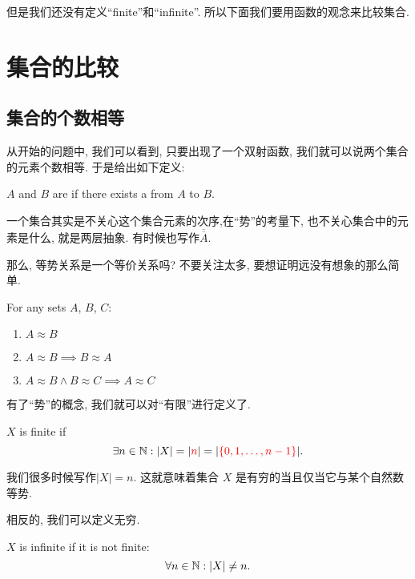 但是我们还没有定义``finite''和``infinite''. 所以下面我们要用函数的观念来比较集合. 

\section{集合的比较}

\subsection{集合的个数相等}

从开始的问题中, 我们可以看到, 只要出现了一个双射函数, 我们就可以说两个集合的元素个数相等. 于是给出如下定义:
\begin{definition}[$|A| = |B| \;(A \approx B)$ (1878)]
    $A$ and $B$ are 
    if there exists a  from $A$ to $B$.
\end{definition}

一个集合其实是不关心这个集合元素的次序,在``势''的考量下, 也不关心集合中的元素是什么, 就是两层抽象. 有时候也写作$\overline{\overline{A}}$. 

那么, 等势关系是一个等价关系吗? 不要关注太多, 要想证明远没有想象的那么简单.

\begin{theorem}{}
    For any sets $A$, $B$, $C$:
    \begin{enumerate}
      \item $A \approx B$
      \item $A \approx B \implies B \approx A$
      \item $A \approx B \land B \approx C \implies A \approx C$
    \end{enumerate}
\end{theorem}

有了``势''的概念, 我们就可以对``有限''进行定义了. 
\begin{definition}[Finite]
    $X$ is finite if
    \[
      \exists n \in \mathbb{N}: |X| = |\textcolor{red}{n}| = |\textcolor{red}{\{0, 1, \dots, n-1\}}|.
    \]
\end{definition}
我们很多时候写作$|X| = n$. 这就意味着集合 $X$ 是有穷的当且仅当它与某个自然数等势. 

相反的, 我们可以定义无穷. 

\begin{definition}[Infinite]
    $X$ is infinite if it is not finite:
    \[
      \forall n \in \mathbb{N}: |X| \neq n.
    \]
\end{definition}

